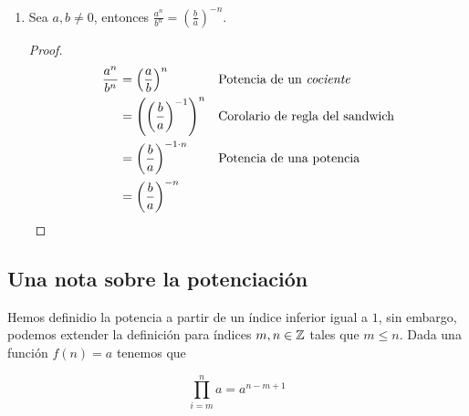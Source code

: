 \begin{enumerate}[label=\alph*)]
  \item Sea $a,b\neq 0$, entonces $\frac{a^n}{b^n} = \left(\frac{b}{a}\right)^{-n}$.
  \begin{proof}\leavevmode
    \begin{align*}
      \frac{a^n}{b^n} &= \left(\frac{a}{b}\right)^n && \text{Potencia de un \textit{cociente}}\\
      &= \left(\left(\frac{b}{a}\right)^{-1}\right)^n && \text{Corolario de regla del sandwich}\\
      &= \left(\frac{b}{a}\right)^{-1\cdot n} && \text{Potencia de una potencia}\\
      &= \left(\frac{b}{a}\right)^{-n}
    \end{align*}
  \end{proof}
  
\end{enumerate}

\subsection*{Una nota sobre la potenciación}

Hemos definidio la potencia a partir de un índice inferior igual a $1$, sin embargo, podemos extender la definición para índices $m, n\in \mathbb{Z}$ tales que $m\leq n$. Dada una función $f(n)=a$ tenemos que

\[\prod_{i=m}^{n} a = a^{n-m+1}\]

